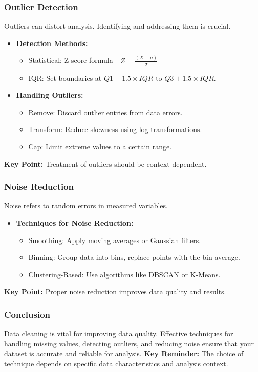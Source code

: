 \documentclass{beamer}
\begin{document}
\begin{frame}[fragile]
    \frametitle{Outlier Detection}
    Outliers can distort analysis. Identifying and addressing them is crucial.
    \begin{itemize}
        \item \textbf{Detection Methods:}
        \begin{itemize}
            \item Statistical: Z-score formula - \( Z = \frac{(X - \mu)}{\sigma} \)
            \item IQR: Set boundaries at \( Q1 - 1.5 \times IQR \) to \( Q3 + 1.5 \times IQR \).
        \end{itemize}
        \item \textbf{Handling Outliers:}
        \begin{itemize}
            \item Remove: Discard outlier entries from data errors.
            \item Transform: Reduce skewness using log transformations.
            \item Cap: Limit extreme values to a certain range.
        \end{itemize}
    \end{itemize}
    \textbf{Key Point:} Treatment of outliers should be context-dependent.
\end{frame}

\begin{frame}[fragile]
    \frametitle{Noise Reduction}
    Noise refers to random errors in measured variables.
    \begin{itemize}
        \item \textbf{Techniques for Noise Reduction:}
        \begin{itemize}
            \item Smoothing: Apply moving averages or Gaussian filters.
            \item Binning: Group data into bins, replace points with the bin average.
            \item Clustering-Based: Use algorithms like DBSCAN or K-Means.
        \end{itemize}
    \end{itemize}
    \textbf{Key Point:} Proper noise reduction improves data quality and results.
\end{frame}

\begin{frame}[fragile]
    \frametitle{Conclusion}
    Data cleaning is vital for improving data quality. Effective techniques for handling missing values, detecting outliers, and reducing noise ensure that your dataset is accurate and reliable for analysis. 
    \textbf{Key Reminder:} The choice of technique depends on specific data characteristics and analysis context.
\end{frame}
\end{document}
